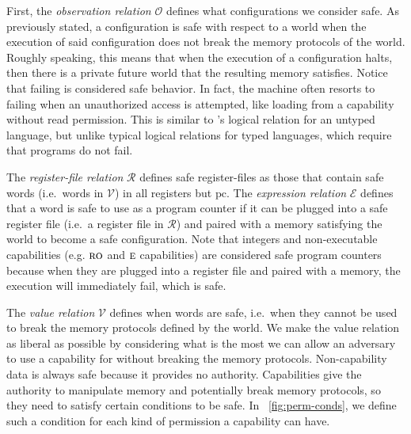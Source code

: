 \documentclass{llncs}
\newcommand{\pcreg}{\mathrm{pc}}
\newcommand{\asmType}{\plaindom{AsmType}}
\newcommand{\plaindom}[1]{\mathrm{#1}}
\newcommand{\intr}[2]{\mathcal{#1}}
\newcommand{\valueintr}[1]{\intr{V}{#1}}
\newcommand{\exprintr}[1]{\intr{E}{#1}}
\newcommand{\regintr}[1]{\intr{R}{#1}}
\newcommand{\stdvr}{\valueintr{\asmType}}
\newcommand{\stder}{\exprintr{\asmType}}
\newcommand{\stdrr}{\regintr{\asmType}}
\newcommand{\observations}{\mathcal{O}}
\newcommand{\plainperm}[1]{\textsc{#1}}
\newcommand{\readonly}{\plainperm{ro}}
\newcommand{\entry}{\plainperm{e}}
\begin{document}
First, the \emph{observation relation} $\observations$ defines what
configurations we consider safe. As previously stated, a configuration is safe
with respect to a world when the execution of said configuration does not break
the memory protocols of the world. Roughly speaking, this means that when the
execution of a configuration halts, then there is a private future world that
the resulting memory satisfies. Notice that failing is considered safe behavior.
In fact, the machine often resorts to failing when an unauthorized access is
attempted, like loading from a capability without read permission. This is
similar to \cite{Devriese:2016ObjCap}'s logical relation for an untyped
language, but unlike typical logical relations for typed languages, which
require that programs do not fail.

The \emph{register-file relation} $\stdrr$ defines safe register-files as those
that contain safe words (i.e.\ words in $\stdvr$) in all registers but $\pcreg$.
The \emph{expression relation} $\stder$ defines that a word is safe to use as a
program counter if it can be plugged into a safe register file (i.e.\ a register
file in $\stdrr$) and paired with a memory satisfying the world to become a safe
configuration. Note that integers and non-executable capabilities (e.g.
$\readonly$ and $\entry$ capabilities) are considered safe program counters
because when they are plugged into a register file and paired with a memory, the
execution will immediately fail, which is safe.

The \emph{value relation} $\stdvr$ defines when words are safe, i.e.\ when they
cannot be used to break the memory protocols defined by the world. We make the
value relation as liberal as possible by considering what is the most we can
allow an adversary to use a capability for without breaking the memory
protocols. Non-capability data is always safe because it provides no
authority. Capabilities give the authority to manipulate memory and potentially
break memory protocols, so they need to satisfy certain conditions to be
safe. In \figurename~\ref{fig:perm-conds}, we define such a condition for each
kind of permission a capability can have.
\end{document}
